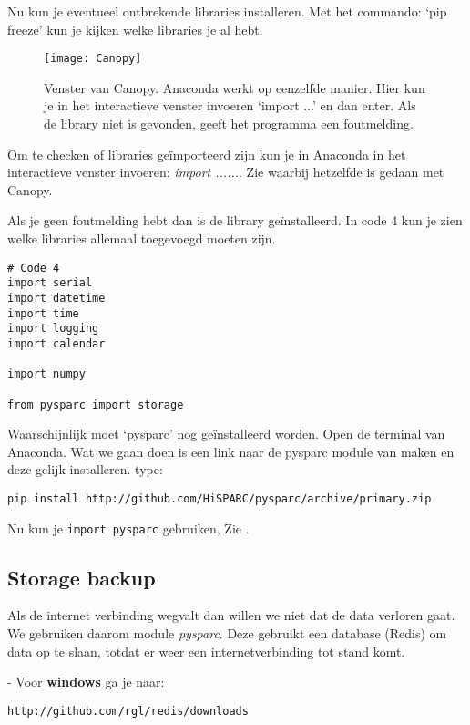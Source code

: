 Nu kun je eventueel ontbrekende libraries installeren. Met het commando:
`pip freeze' kun je kijken welke libraries je al hebt.

\begin{figure}
    \centering
    \texttt{[image: Canopy]}
    \caption{Venster van Canopy. Anaconda werkt op eenzelfde manier. Hier kun je
    in het interactieve venster invoeren `import ...' en dan enter. Als de library
    niet is gevonden, geeft het programma een foutmelding.}
    \label{fig:canopy1}
\end{figure}

Om te checken of libraries geïmporteerd zijn kun je in Anaconda in het
interactieve venster invoeren: \emph{import ......}. Zie
 waarbij hetzelfde is gedaan met Canopy.

Als je geen foutmelding hebt dan is de library geïnstalleerd.
In code 4 kun je zien welke libraries allemaal toegevoegd moeten zijn.

\begin{verbatim}
# Code 4
import serial
import datetime
import time
import logging
import calendar

import numpy

from pysparc import storage
\end{verbatim}

Waarschijnlijk moet `pysparc' nog geïnstalleerd worden. Open de terminal van
Anaconda. Wat we gaan doen is een link naar de pysparc module van \hisparc
maken en deze gelijk installeren. type:
\begin{verbatim}
pip install http://github.com/HiSPARC/pysparc/archive/primary.zip
\end{verbatim}

Nu kun je \verb|import pysparc| gebruiken, Zie .


\subsection{Storage backup}

Als de internet verbinding wegvalt dan willen we niet dat de data verloren gaat.
We gebruiken daarom module \emph{pysparc}. Deze gebruikt een database (Redis) om data
op te slaan, totdat er weer een internetverbinding tot stand komt.

- Voor \textbf{windows} ga je naar:
\begin{verbatim}
http://github.com/rgl/redis/downloads
\end{verbatim}

